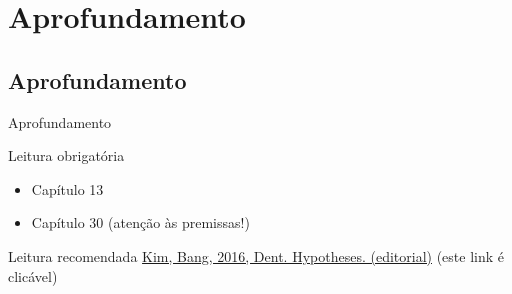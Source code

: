 \documentclass{beamer}
\begin{document}



\section{Aprofundamento}

\subsection{Aprofundamento}

\begin{frame}{Aprofundamento}
  \begin{block}{Leitura obrigatória}
    \begin{itemize}
    \item Capítulo 13
    \item Capítulo 30 (atenção às premissas!)
    \end{itemize}
  \end{block}
  \begin{block}{Leitura recomendada}
    \small
    \href{https://www.ncbi.nlm.nih.gov/pmc/articles/PMC5042133/}{Kim, Bang, 2016, Dent. Hypotheses. (editorial)} {\tiny (este link é clicável)}
  \end{block}
\end{frame}
\end{document}
